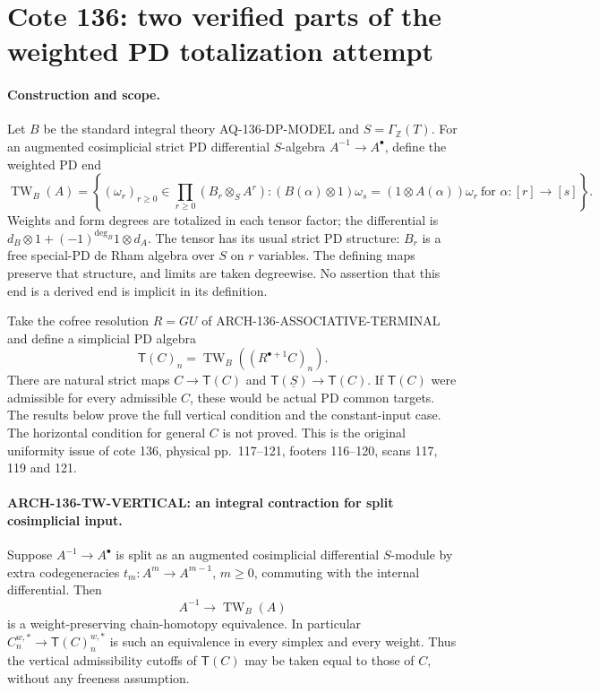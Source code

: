 \section{Cote 136: two verified parts of the weighted PD totalization attempt}
\label{sec:136twpartial}

\paragraph{Construction and scope.}
Let $B$ be the standard integral theory AQ-136-DP-MODEL and
$S=\Gamma_{\mathbb Z}(T)$. For an augmented cosimplicial
strict PD differential $S$-algebra $A^{-1}\to A^\bullet$,
define the weighted PD end
\[
 \operatorname{TW}_B(A)=
  \left\{(\omega_r)_{r\geq0}\in\prod_{r\geq0}
       (B_r\otimes_S A^r):
 (B(\alpha)\otimes1)\omega_s
       =(1\otimes A(\alpha))\omega_r\ \text{for }\alpha:[r]\to[s]
  \right\}.                                               \tag{136.TW1}
\]
Weights and form degrees are totalized in each tensor factor;
the differential is $d_B\otimes1+(-1)^{\deg_B}1\otimes d_A$.
The tensor has its usual strict PD structure: $B_r$ is a
free special-PD de Rham algebra over $S$ on $r$ variables.
The defining maps preserve that structure, and limits are
taken degreewise. No assertion that this end is a derived
end is implicit in its definition.

Take the cofree resolution $R=GU$ of
ARCH-136-ASSOCIATIVE-TERMINAL and define a simplicial PD
algebra
\[
       \mathsf T(C)_n=
       \operatorname{TW}_B((R^{\bullet+1}C)_n).
                                                               \tag{136.TW2}
\]
There are natural strict maps
$C\to\mathsf T(C)$ and
$\mathsf T(\underline S)\to\mathsf T(C)$.
If $\mathsf T(C)$ were admissible for every admissible $C$,
these would be actual PD common targets. The results below
prove the full vertical condition and the constant-input
case. The horizontal condition for general $C$ is not proved.
This is the original uniformity issue of cote 136, physical
pp.~117--121, footers 116--120, scans 117, 119 and 121.

\paragraph{ARCH-136-TW-VERTICAL: an integral contraction for split cosimplicial input.}
Suppose $A^{-1}\to A^\bullet$ is split as an augmented
cosimplicial differential $S$-module by extra codegeneracies
$t_m:A^m\to A^{m-1}$, $m\geq0$, commuting with the internal
differential. Then
\[
                A^{-1}\longrightarrow\operatorname{TW}_B(A)
                                                               \tag{136.TW3}
\]
is a weight-preserving chain-homotopy equivalence. In
particular $C_n^{w,*}\to\mathsf T(C)_n^{w,*}$ is such an
equivalence in every simplex and every weight. Thus the
vertical admissibility cutoffs of $\mathsf T(C)$ may be
taken equal to those of $C$, without any freeness assumption.

